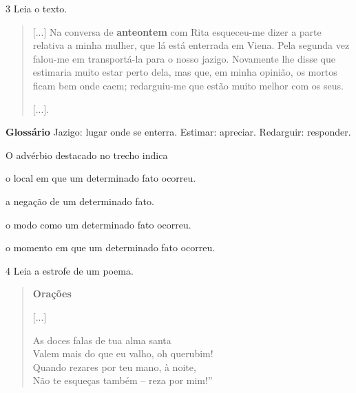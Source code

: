 \num{3} Leia o texto.

\begin{quote}
{[}...{]} Na conversa de \textbf{anteontem} com Rita esqueceu-me dizer
a parte relativa a minha mulher, que lá está enterrada em Viena. Pela
segunda vez falou-me em transportá-la para o nosso jazigo. Novamente lhe
disse que estimaria muito estar perto dela, mas que, em minha opinião,
os mortos ficam bem onde caem; redarguiu-me que estão muito melhor com
os seus.

{[}...{]}.

\end{quote}

\textbf{Glossário}
Jazigo: lugar onde se enterra.
Estimar: apreciar.
Redarguir: responder.

O advérbio destacado no trecho indica

\begin{escolha}
\item o local em que um determinado fato ocorreu.

\item a negação de um determinado fato.

\item o modo como um determinado fato ocorreu.

\item o momento em que um determinado fato ocorreu.
\end{escolha}


\num{4} Leia a estrofe de um poema.

\begin{quote}
\textbf{Orações}

{[}...{]}

As doces falas de tua alma santa\\
Valem mais do que eu valho, oh querubim!\\
Quando rezares por teu mano, à noite,\\
Não te esqueças também -- reza por mim!”

\end{quote}

